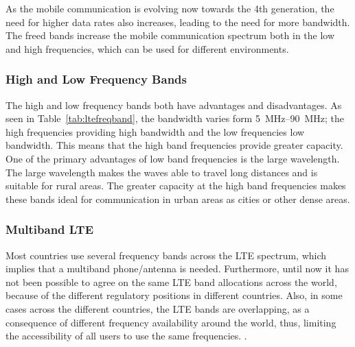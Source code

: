 As the mobile communication is evolving now towards the 4th generation, the need for higher data rates also increases, leading to the need for more bandwidth. The freed bands increase the mobile communication spectrum both in the low and high frequencies, which can be used for different environments.  

\subsubsection{High and Low Frequency Bands}
The high and low frequency bands both have advantages and disadvantages. As seen in Table~\ref{tab:ltefreqband}, the bandwidth varies form \SIrange{5}{90}{MHz}; the high frequencies providing high bandwidth and the low frequencies low bandwidth. This means that the high band frequencies provide greater capacity. One of the primary advantages of low band frequencies is the large wavelength. The large wavelength makes the waves able to travel long distances and is suitable for rural areas. The greater capacity at the high band frequencies makes these bands ideal for communication in urban areas as cities or other dense areas. 

\subsubsection{Multiband LTE}
Most countries use several frequency bands across the LTE spectrum, which implies that a multiband phone/antenna is needed.  
Furthermore, until now it has not been possible to agree on the same LTE band allocations across the world, because of the different regulatory positions in different countries. Also, in some cases across the different countries, the LTE bands are overlapping, as a consequence of different frequency availability around the world, thus, limiting the accessibility of all users to use the same frequencies. \cite{radio2015electronics}.  

